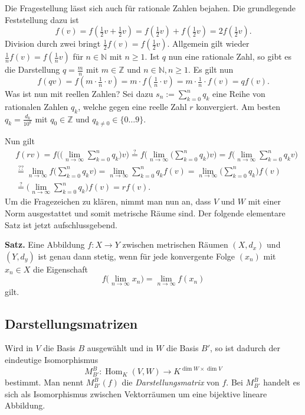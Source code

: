 \documentclass[a4paper,11pt,fleqn,twoside]{scrartcl}
\numberwithin{equation}{section}
\newcommand{\N}{\mathbb N}
\newcommand{\Z}{\mathbb Z}
\theoremstyle{rmbox}
\begin{document}
Die Fragestellung lässt sich auch für rationale Zahlen bejahen.
Die grundlegende Feststellung dazu ist
\begin{equation}
f(v) = f(\tfrac{1}{2}v+\tfrac{1}{2}v) = f(\tfrac{1}{2}v) + f(\tfrac{1}{2}v)
= 2f(\tfrac{1}{2}v).
\end{equation}
Division durch zwei bringt $\tfrac{1}{2}f(v) = f(\tfrac{1}{2}v)$.
Allgemein gilt wieder $\frac{1}{n}f(v) = f(\tfrac{1}{n}v)$ für
$n\in\N$ mit $n\ge 1$. Ist $q$ nun eine rationale Zahl, so gibt
es die Darstellung $q=\frac{m}{n}$ mit $m\in\Z$ und $n\in\N, n\ge 1$.
Es gilt nun
\begin{equation}
f(qv) = f(m\cdot\tfrac{1}{n}\cdot v) = m\cdot f(\tfrac{1}{n}\cdot v)
= m\cdot\tfrac{1}{n}\cdot f(v) = qf(v).
\end{equation}
Was ist nun mit reellen Zahlen? Sei dazu $s_n:=\sum_{k=0}^n q_k$
eine Reihe von rationalen Zahlen $q_k$, welche gegen eine reelle
Zahl $r$ konvergiert. Am besten $q_k = \frac{d_k}{10^k}$ mit
$q_0\in\Z$ und $q_{k\ne 0}\in\{0\ldots 9\}$.

Nun gilt
\begin{equation}
\begin{split}
&f(rv) = f\bigg(\bigg(\lim_{n\to\infty}\sum_{k=0}^n q_k\bigg)v\bigg)
\stackrel{?}= f\bigg(\lim_{n\to\infty}\bigg(\sum_{k=0}^n q_k\bigg)v\bigg)
= f\bigg(\lim_{n\to\infty}\sum_{k=0}^n q_k v\bigg)\\
&\stackrel{??}= \lim_{n\to\infty} f\bigg(\sum_{k=0}^n q_k v\bigg)
= \lim_{n\to\infty}\sum_{k=0}^n q_k f(v)
= \lim_{n\to\infty}\bigg(\sum_{k=0}^n q_k\bigg) f(v)\\
&\stackrel{?}= \bigg(\lim_{n\to\infty}\sum_{k=0}^n q_k\bigg) f(v)
= r f(v).
\end{split}
\end{equation}
Um die Fragezeichen zu klären, nimmt man nun an, dass $V$ und $W$
mit einer Norm ausgestattet und somit metrische Räume sind.
Der folgende elementare Satz ist jetzt aufschlussgebend.

\textbf{Satz.} Eine Abbildung $f\colon X\to Y$ zwischen metrischen
Räumen $(X,d_x)$ und $(Y,d_y)$ ist genau dann stetig, wenn für
jede konvergente Folge $(x_n)$ mit $x_n\in X$ die Eigenschaft
\begin{equation}
f\Big(\lim_{n\to\infty} x_n\Big) = \lim_{n\to\infty} f(x_n)
\end{equation}
gilt.

\subsection{Darstellungsmatrizen}
Wird in $V$ die Basis $B$ ausgewählt und in $W$ die Basis $B'$,
so ist dadurch der eindeutige Isomorphismus
\begin{equation}
M_{B'}^B\colon \operatorname{Hom}_K(V,W)\to K^{\dim W\times\dim V}
\end{equation}
bestimmt. Man nennt $M_{B'}^B(f)$ die \emph{Darstellungsmatrix}
von $f$. Bei $M_{B'}^B$ handelt es sich als Isomorphismus zwischen
Vektorräumen um eine bijektive lineare Abbildung.
\end{document}

